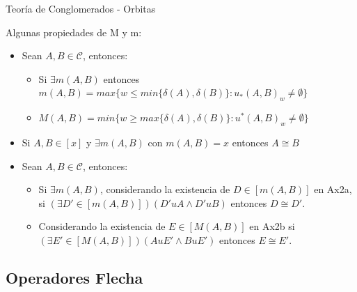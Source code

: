 \documentclass{beamer}
\begin{document}
\begin{frame}{Teoría de Conglomerados - Orbitas}

Algunas propiedades de M y m:
\begin{itemize}
    \item 	Sean $A,B \in \mathcal{C}$, entonces:
	\begin{itemize} 
		\item[a)] Si $\exists m(A,B)$ entonces $m(A,B) = max\{w \le min\{\delta(A),\delta(B)\}: u_*(A,B)_w \ne \emptyset \}$
		\item[b)] $M(A,B) = min\{w \ge max\{\delta(A),\delta(B)\}: u^*(A,B)_w \ne \emptyset \}$  
	\end{itemize}
	\item Si $A,B \in [x]$ y $\exists m(A,B)$ con $m(A,B) = x$ entonces $A \cong B$
	\item Sean $A,B \in \mathcal{C}$, entonces:
	\begin{itemize}
	  	\item [a)] Si $\exists m(A,B)$, considerando la existencia de $D \in [m(A,B)]$ en Ax2a, si $(\exists D' \in [m(A,B)])(D'uA \wedge D'uB)$ entonces $D \cong D'$.
	   \item [b)] Considerando la existencia de $E \in [M(A,B)]$ en Ax2b si $(\exists E' \in [M(A,B)])(AuE'\wedge BuE')$ entonces $E \cong E'$.
	\end{itemize}
\end{itemize}

\end{frame}

\subsection{Operadores Flecha}
\end{document}
